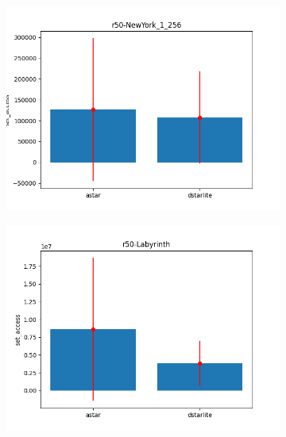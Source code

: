\documentclass{beamer}
\begin{document}
\begin{frame}
\begin{figure}
            \hfill
            \begin{subfigure}[b]{0.49\textwidth}
                \centering
                \includegraphics[width=\textwidth]{../figures/astar-to-dstarlite/r50-NewYork_1_256}
            \end{subfigure}
            \hfill
            \begin{subfigure}[b]{0.49\textwidth}
                \centering
                \includegraphics[width=\textwidth]{../figures/astar-to-dstarlite/r50-Labyrinth}
            \end{subfigure}
        \end{figure}
    \end{frame}
\end{document}
